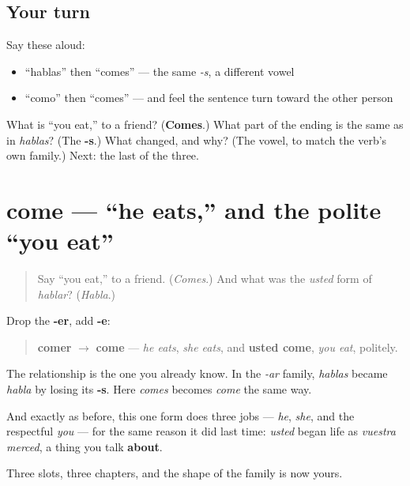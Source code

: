 \subsection*{Your turn}
Say these aloud:

\begin{itemize}
\raggedright
  \item \textquotedblleft{}hablas\textquotedblright{} then \textquotedblleft{}comes\textquotedblright{} — the same \emph{-s}, a different vowel
  \item \textquotedblleft{}como\textquotedblright{} then \textquotedblleft{}comes\textquotedblright{} — and feel the sentence turn toward the other person
\end{itemize}

\begin{tcolorbox}[breakable,colback=teal!4,colframe=teal!35!black,title={Before you move on}]
What is \textquotedblleft{}you eat,\textquotedblright{} to a friend? (\textbf{Comes}.) What part of the ending is the same as in \emph{hablas}? (The \textbf{-s}.) What changed, and why? (The vowel, to match the verb's own family.) Next: the last of the three.
\end{tcolorbox}
\section[come]{come — \textquotedblleft{}he eats,\textquotedblright{} and the polite \textquotedblleft{}you eat\textquotedblright{}}

\label{lesson:ES-C07-come}



\begin{quote}
Say \textquotedblleft{}you eat,\textquotedblright{} to a friend. (\emph{Comes}.) And what was the \emph{usted} form of \emph{hablar}? (\emph{Habla}.)
\end{quote}

\begin{grammarlens}[title={Grammar Lens: take the -s off again}]
Drop the \textbf{-er}, add \textbf{-e}:

\begin{quote}
\textbf{comer} $\to$ \textbf{come} — \emph{he eats}, \emph{she eats}, and \textbf{usted come}, \emph{you eat}, politely.
\end{quote}

The relationship is the one you already know. In the \emph{-ar} family, \emph{hablas} became \emph{habla} by losing its \textbf{-s}. Here \emph{comes} becomes \emph{come} the same way.

And exactly as before, this one form does three jobs — \emph{he}, \emph{she}, and the respectful \emph{you} — for the same reason it did last time: \emph{usted} began life as \emph{vuestra merced}, a thing you talk \textbf{about}.

Three slots, three chapters, and the shape of the family is now yours.
\end{grammarlens}

